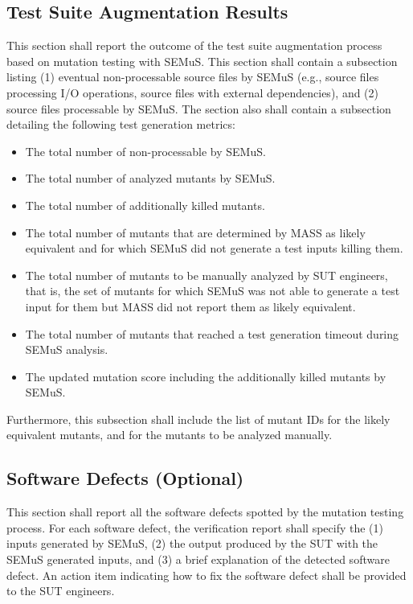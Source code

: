 \subsection{Test Suite Augmentation Results}

This section shall report the outcome of the test suite augmentation process based on mutation testing with SEMuS. This section shall contain a subsection listing (1) eventual non-processable source files by SEMuS (e.g., source files processing I/O operations, source files with external dependencies), and (2) source files processable by SEMuS.
The section also shall contain a subsection detailing the following test generation metrics:
\begin{itemize}
    \item The total number of non-processable by SEMuS.
    \item The total number of analyzed mutants by SEMuS.
    \item The total number of additionally killed mutants.
    \item The total number of mutants that are determined by MASS as likely equivalent and for which SEMuS did not generate a test inputs killing them.
    \item The total number of mutants to be manually analyzed by SUT engineers, that is, the set of mutants for which SEMuS was not able to generate a test input for them but MASS did not report them as likely equivalent.
    \item The total number of mutants that reached a test generation timeout during SEMuS analysis.
    \item The updated mutation score including the additionally killed mutants by SEMuS.
\end{itemize}

Furthermore, this subsection shall include the list of mutant IDs for the likely equivalent mutants, and for the mutants to be analyzed manually.

\subsection{Software Defects (Optional)}

This section shall report all the software defects spotted by the mutation testing process. For each software defect, the verification report shall specify the (1) inputs generated by SEMuS, (2) the output produced by the SUT with the SEMuS generated inputs, and (3) a brief explanation of the detected software defect.
An action item indicating how to fix the software defect shall be provided to the SUT engineers.


